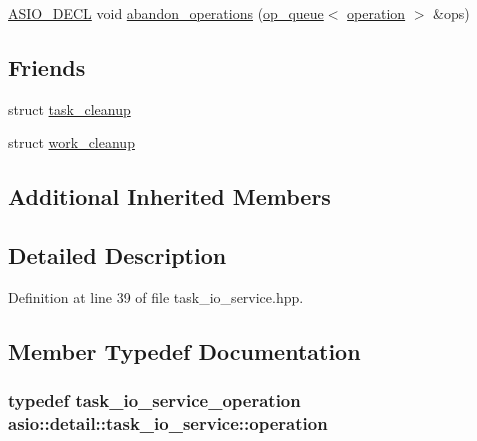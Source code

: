 \begin{DoxyCompactItemize}
\item 
\hyperlink{config_8hpp_ab54d01ea04afeb9a8b39cfac467656b7}{A\+S\+I\+O\+\_\+\+D\+E\+C\+L} void \hyperlink{classasio_1_1detail_1_1task__io__service_aba439509604dc30565d4a059bd9310b3}{abandon\+\_\+operations} (\hyperlink{classasio_1_1detail_1_1op__queue}{op\+\_\+queue}$<$ \hyperlink{classasio_1_1detail_1_1task__io__service_abb8a2a1b24b3cbf9afd8d19bf4bd6929}{operation} $>$ \&ops)
\end{DoxyCompactItemize}
\subsection*{Friends}
\begin{DoxyCompactItemize}
\item 
struct \hyperlink{classasio_1_1detail_1_1task__io__service_a4da41e8803e9cdda504ad01b308155af}{task\+\_\+cleanup}
\item 
struct \hyperlink{classasio_1_1detail_1_1task__io__service_a9e2a288602d993c85a8fd5bc70de607e}{work\+\_\+cleanup}
\end{DoxyCompactItemize}
\subsection*{Additional Inherited Members}


\subsection{Detailed Description}


Definition at line 39 of file task\+\_\+io\+\_\+service.\+hpp.



\subsection{Member Typedef Documentation}
\hypertarget{classasio_1_1detail_1_1task__io__service_abb8a2a1b24b3cbf9afd8d19bf4bd6929}{}
\subsubsection[{operation}]{\setlength{\rightskip}{0pt plus 5cm}typedef task\+\_\+io\+\_\+service\+\_\+operation {\bf asio\+::detail\+::task\+\_\+io\+\_\+service\+::operation}}\label{classasio_1_1detail_1_1task__io__service_abb8a2a1b24b3cbf9afd8d19bf4bd6929}


